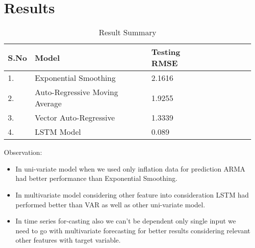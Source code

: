 \chapter{Results}

\begin{table}[ht]
\centering
\caption{Result Summary}
\label{tab2}
\begin{tabular}{llllllll}
 \hline
S.No & Model & Testing RMSE\\
\hline
 1. & Exponential Smoothing & 2.1616 \\
 2. & Auto-Regressive Moving Average & 1.9255 \\ 
 3. & Vector Auto-Regressive & 1.3339 \\ 
 4. & LSTM Model & 0.089 \\ 
\hline
\end{tabular}
\end{table}

Observation:
\begin{itemize}
    \item In uni-variate model when we used only inflation data for prediction ARMA had better performance than Exponential Smoothing.
    \item In multivariate model considering other feature into consideration LSTM had performed better than VAR as well as other uni-variate model.
    \item In time series for-casting also we can't be dependent only single input we need to go with multivariate forecasting for better results considering relevant other features with target variable.
\end{itemize}



